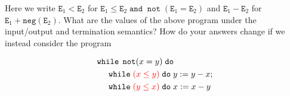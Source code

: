 \documentclass{article}
\newcommand{\E}{\mathtt{E}}
\newcommand{\andsym}{\mathtt{and}}
\newcommand{\notsym}{\mathop{\mathtt{not}}}
\newcommand{\whilesym}{\mathtt{while}}
\newcommand{\dosym}{\mathtt{do}}
\newcommand{\negation}{\mathtt{neg}}
\begin{document}
\begin{enumerate}
{Here we write $\E_1 < \E_2$ for $\E_1 \leq \E_2 \; \andsym \; \notsym(\E_1 = \E_2)$ and $\E_1 - \E_2$ for $\E_1 + \negation(\E_2)$. 
What are the values of the above program under the input/output and termination semantics? 
How do your answers change if we instead consider the program

\begin{align*}
& \whilesym \; \notsym(x = y) \; \dosym \\
& \;\;\;\;\; \whilesym \; {\color{red} (x \leq y)} \; \dosym \; y := y - x; \\
& \;\;\;\;\; \whilesym \; {\color{red} (y \leq x)} \; \dosym \; x := x - y
\end{align*}
}

\end{enumerate}
\end{document}
